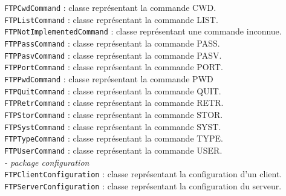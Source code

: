 \begin{tabbing}
			\>\>\verb+FTPCwdCommand+ : classe représentant la commande CWD.\\
			\>\>\verb+FTPListCommand+ : classe représentant la commande LIST.\\
			\>\>\verb+FTPNotImplementedCommand+ : classe représentant une commande inconnue.\\
			\>\>\verb+FTPPassCommand+ : classe représentant la commande PASS.\\
			\>\>\verb+FTPPasvCommand+ : classe représentant la commande PASV.\\
			\>\>\verb+FTPPortCommand+ : classe représentant la commande PORT.\\
			\>\>\verb+FTPPwdCommand+ : classe représentant la commande PWD\\
			\>\>\verb+FTPQuitCommand+ : classe représentant la commande QUIT.\\
			\>\>\verb+FTPRetrCommand+ : classe représentant la commande RETR.\\
			\>\>\verb+FTPStorCommand+ : classe représentant la commande STOR.\\
			\>\>\verb+FTPSystCommand+ : classe représentant la commande SYST.\\
			\>\>\verb+FTPTypeCommand+ : classe représentant la commande TYPE.\\
			\>\>\verb+FTPUserCommand+ : classe représentant la commande USER.\\
		\>\textit{- package configuration}\\
			\>\>\verb+FTPClientConfiguration+ : classe représentant la configuration d'un client.\\
			\>\>\verb+FTPServerConfiguration+ : classe représentant la configuration du serveur.\\
\end{tabbing}

